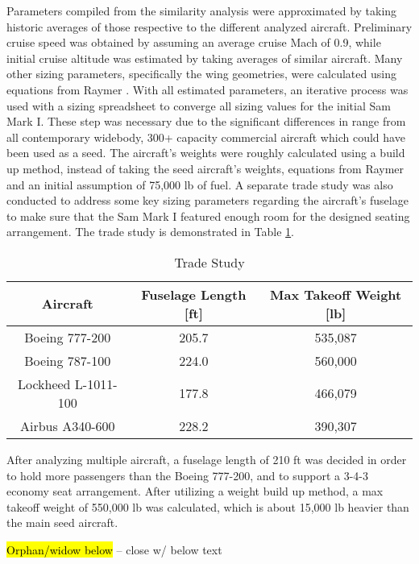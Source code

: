 Parameters compiled from the similarity analysis were approximated by taking historic averages of those respective to the different analyzed aircraft. Preliminary cruise speed was obtained by assuming an average cruise Mach of 0.9, while initial cruise altitude was estimated by taking averages of similar aircraft. Many other sizing parameters, specifically the wing geometries, were calculated using equations from Raymer \cite{raymer}. With all estimated parameters, an iterative process was used with a sizing spreadsheet to converge all sizing values for the initial Sam Mark I. These step was necessary due to the significant differences in range from all contemporary widebody, 300+ capacity commercial aircraft which could have been used as a seed.  The aircraft's weights were roughly calculated using a build up method, instead of taking the seed aircraft's weights, equations from Raymer \cite{raymer} and an initial assumption of 75,000 lb of fuel. A separate trade study was also conducted to address some key sizing parameters regarding the aircraft's fuselage to make sure that the Sam Mark I featured enough room for the designed seating arrangement. The trade study is demonstrated in Table \ref{tab:trade_params}.

\begin{table}[h!] 
    \centering
    \caption{Trade Study}
    \begin{tabular}{ |c||c||c| }\toprule
    \textbf{Aircraft} & \textbf{Fuselage Length [ft]} & \textbf{Max Takeoff Weight [lb]} \\\hline\hline
    Boeing 777-200 & 205.7 & 535,087  \\\hline
    Boeing 787-100 & 224.0 & 560,000  \\\hline
    Lockheed L-1011-100 & 177.8 & 466,079  \\\hline
    Airbus A340-600 & 228.2 & 390,307  \\\hline

    \end{tabular}\label{tab:trade_params}
\end{table}

\newpage

After analyzing multiple aircraft, a fuselage length of 210 ft was decided in order to hold more passengers than the Boeing 777-200, and to support a 3-4-3 economy seat arrangement. After utilizing a weight build up method, a max takeoff weight of 550,000 lb was calculated, which is about 15,000 lb heavier than the main seed aircraft. 

\hl{Orphan/widow below} -- close w/ below text 

